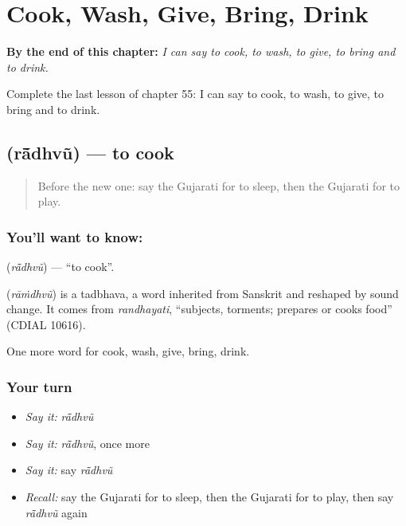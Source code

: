 
\chapter{Cook, Wash, Give, Bring, Drink}
\label{ch:gu-cook-wash-give-bring-drink}

\begin{chapteropening}
\textbf{By the end of this chapter:} \emph{I can say to cook, to wash, to give, to bring and to drink.}

Complete the last lesson of chapter 55: I can say to cook, to wash, to give, to bring and to drink.
\end{chapteropening}

\section[\texorpdfstring{\gu{રાંધવું} (rā̃dhvũ)}{રાંધવું (rā̃dhvũ)}]{ (rā̃dhvũ) — to cook}

\label{lesson:GU-C55-randhvu}



\begin{quote}
Before the new one: say the Gujarati for to sleep, then the Gujarati for to play.
\end{quote}

\subsection*{You'll want to know: }
\textbf{} (\emph{rā̃dhvũ}) — \textquotedblleft{}to cook\textquotedblright{}.

\begin{cousinweb}
\textbf{} (\emph{rāṁdhvũ}) is a tadbhava, a word inherited from Sanskrit and reshaped by sound change. It comes from \emph{randhayati}, \textquotedblleft{}subjects, torments; prepares or cooks food\textquotedblright{} (CDIAL 10616).
\end{cousinweb}

\begin{grammarlens}[title={What you've built}]
One more word for cook, wash, give, bring, drink.
\end{grammarlens}

\subsection*{Your turn}
\begin{itemize}
\raggedright
  \item \emph{Say it:} \emph{rā̃dhvũ}
  \item \emph{Say it:} \emph{rā̃dhvũ}, once more
  \item \emph{Say it:} say \emph{rā̃dhvũ}
  \item \emph{Recall:} say the Gujarati for to sleep, then the Gujarati for to play, then say \emph{rā̃dhvũ} again
\end{itemize}

